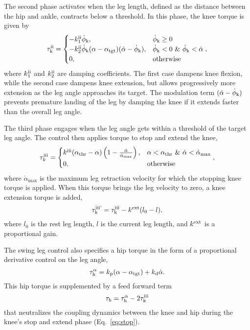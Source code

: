 The second phase activates when the leg length, defined as the distance between
the hip and ankle, contracts below a threshold. In this phase, the knee torque
is given by
\begin{align}
    \tau_{\textnormal{k}}^{\textnormal{ii}} = \begin{cases}
          -k_1^{\textnormal{ii}} \dot \phi_{\textnormal{k}}, & \dot \phi_{\textnormal{k}} \ge 0 \\
          -k_2^{\textnormal{ii}} \dot \phi_{\textnormal{k}}(\alpha - \alpha_{\textnormal{tgt}})
            (\dot{\alpha} - \dot \phi_{\textnormal{k}}), 
          & \dot\phi_{\textnormal{k}} < 0 \ \& \ \dot \phi_{\textnormal{k}} < \dot \alpha\\
          0, & \mathrm{otherwise}
      \end{cases},
    \label{eq:holdphase}
\end{align}
where $k_1^{\textnormal{ii}}$ and $k_2^{\textnormal{ii}}$ are damping coefficients. The first case
dampens knee flexion, while the second case dampens knee extension, but allows
progressively more extension as the leg angle approaches its target. The
modulation term $(\dot \alpha - \dot \phi_{\textnormal{k}})$ prevents premature landing of
the leg by damping the knee if it extends faster than the overall leg angle.

The third phase engages when the leg angle gets within a threshold of the
target leg angle. The control then applies torque to stop and extend the knee,  
\begin{align}
    \tau_k^{\textnormal{iii}} = 
    \begin{cases}
         k^{\textnormal{iii}}(\alpha_{\textnormal{thr}} - \alpha)
            \left(1 - \frac{\dot\alpha}{\dot\alpha_{\textnormal{max}}} \right), 
                & \alpha < \alpha_{\textnormal{thr}} \ \& \ \dot \alpha < \dot \alpha_{\textnormal{max}} \\
        0, & \textnormal{otherwise}
    \end{cases},
    \label{eq:stop}
\end{align}
where $\dot{\alpha}_{\mathrm{max}}$ is the maximum leg retraction velocity for
which the stopping knee torque is applied. When this torque brings the leg
velocity to zero, a knee extension torque is added,
\begin{align}
    \tau_{\textnormal{k}}^{\textnormal{iii'}} = \tau_{\textnormal{k}}^{\textnormal{iii}} - k^{\textnormal{ext}} (l_0 - l),
    \label{eq:extend}
\end{align}
where $l_0$ is the rest leg length, $l$ is the current leg length, and
$k^{\textnormal{ext}}$ is a proportional gain. 

The swing leg control also specifies a hip torque in the form of a proportional
derivative control on the leg angle, 
\begin{align}
    \tau_{\textnormal{h}}^\alpha = k_{\textnormal{p}} (\alpha - \alpha_{\textnormal{tgt}}) + k_{\textnormal{d}} \dot\alpha.
    \label{eq:hipfeedback}
\end{align}
This hip torque is supplemented by a feed forward term 
\begin{align}
    \tau_{\textnormal{h}} = \tau_{\textnormal{h}}^\alpha - 2 \tau_{\textnormal{k}}^{\textnormal{iii}}
    \label{eq:hipfeedforward}
\end{align} 
that neutralizes the coupling dynamics between the knee and hip during the
knee's stop and extend phase (Eq.~\ref{eq:stop}).


